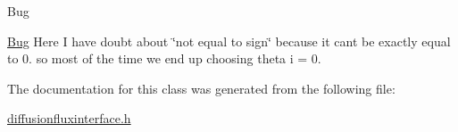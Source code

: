 \begin{DoxyRefDesc}{Bug}
\item[\hyperlink{bug__bug000003}{Bug}]Here I have doubt about \char`\"{}not equal to sign\char`\"{} because it can\textquotesingle{}t be exactly equal to 0. so most of the time we end up choosing theta i = 0. \end{DoxyRefDesc}


The documentation for this class was generated from the following file\+:\begin{DoxyCompactItemize}
\item 
\hyperlink{diffusionfluxinterface_8h}{diffusionfluxinterface.\+h}\end{DoxyCompactItemize}
